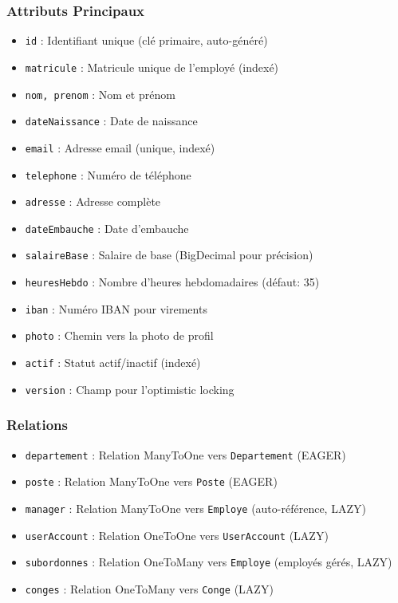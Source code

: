 \documentclass[12pt,a4paper,twoside]{report}
\begin{document}
\subsubsection{Attributs Principaux}
\begin{itemize}
    \item \texttt{id} : Identifiant unique (clé primaire, auto-généré)
    \item \texttt{matricule} : Matricule unique de l'employé (indexé)
    \item \texttt{nom, prenom} : Nom et prénom
    \item \texttt{dateNaissance} : Date de naissance
    \item \texttt{email} : Adresse email (unique, indexé)
    \item \texttt{telephone} : Numéro de téléphone
    \item \texttt{adresse} : Adresse complète
    \item \texttt{dateEmbauche} : Date d'embauche
    \item \texttt{salaireBase} : Salaire de base (BigDecimal pour précision)
    \item \texttt{heuresHebdo} : Nombre d'heures hebdomadaires (défaut: 35)
    \item \texttt{iban} : Numéro IBAN pour virements
    \item \texttt{photo} : Chemin vers la photo de profil
    \item \texttt{actif} : Statut actif/inactif (indexé)
    \item \texttt{version} : Champ pour l'optimistic locking
\end{itemize}

\subsubsection{Relations}
\begin{itemize}
    \item \texttt{departement} : Relation ManyToOne vers \texttt{Departement} (EAGER)
    \item \texttt{poste} : Relation ManyToOne vers \texttt{Poste} (EAGER)
    \item \texttt{manager} : Relation ManyToOne vers \texttt{Employe} (auto-référence, LAZY)
    \item \texttt{userAccount} : Relation OneToOne vers \texttt{UserAccount} (LAZY)
    \item \texttt{subordonnes} : Relation OneToMany vers \texttt{Employe} (employés gérés, LAZY)
    \item \texttt{conges} : Relation OneToMany vers \texttt{Conge} (LAZY)
\end{itemize}
\end{document}
